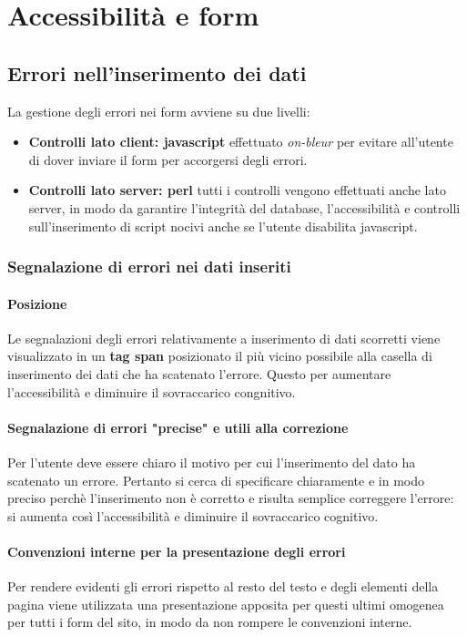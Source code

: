 \documentclass[12pt,a4paper]{article}
\begin{document}
\section{Accessibilità e form}
\subsection{Errori nell'inserimento dei dati}
La gestione degli errori nei form avviene su due livelli:
\begin{itemize}
	\item \textbf{Controlli lato client: javascript} effettuato \textit{on-bleur} per evitare all'utente di dover inviare il form per accorgersi degli errori.
	\item \textbf{Controlli lato server: perl} tutti i controlli vengono effettuati anche lato server, in modo da garantire l'integrità del database, l'accessibilità e controlli sull'inserimento di script nocivi anche se l'utente disabilita javascript.
\end{itemize}
\subsubsection{Segnalazione di errori nei dati inseriti}
\paragraph{Posizione} Le segnalazioni degli errori relativamente a inserimento di dati scorretti viene visualizzato in un \textbf{tag span} posizionato il più vicino possibile alla casella di inserimento dei dati che ha scatenato l'errore. Questo per aumentare l'accessibilità e diminuire il sovraccarico congnitivo. 
\paragraph{Segnalazione di errori "precise" e utili alla correzione} Per l'utente deve essere chiaro il motivo per cui l'inserimento del dato ha scatenato un errore. Pertanto si cerca di specificare chiaramente e in modo preciso perchè l'inserimento non è corretto e risulta semplice correggere l'errore: si aumenta così l'accessibilità e diminuire il sovraccarico cognitivo. 
\paragraph{Convenzioni interne per la presentazione degli errori} Per rendere evidenti gli errori rispetto al resto del testo e degli elementi della pagina viene utilizzata una presentazione apposita per questi ultimi omogenea per tutti i form del sito, in modo da non rompere le convenzioni interne.
\end{document}
